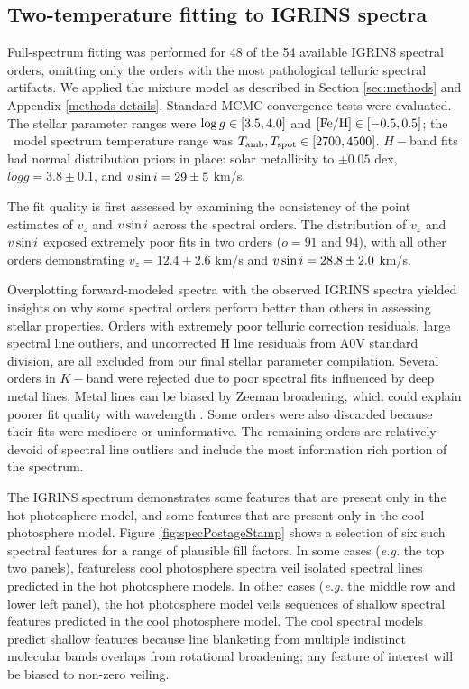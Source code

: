 \documentclass[twocolumn]{emulateapj}%
\begin{document}


\subsection{Two-temperature fitting to IGRINS spectra}\label{sec:two_tempIGRINS}


Full-spectrum fitting was performed for 48 of the 54 available IGRINS spectral orders, omitting only the orders with the most pathological telluric spectral artifacts. We applied the mixture model as described in Section \ref{sec:methods} and Appendix \ref{methods-details}.  Standard MCMC convergence tests were evaluated.  The stellar parameter ranges were $\log g \in [3.5, 4.0]$ and $[{\rm Fe}/{\rm H}] \in [-0.5, 0.5]$; the \PHOENIX\ model spectrum temperature range was $T_\textrm{amb}, T_\textrm{spot} \in [2700, 4500]$.  $H-$band fits had normal distribution priors in place: solar metallicity to $\pm0.05$ dex, $logg=3.8\pm0.1$, and $v \sin i=29\pm5$ km/s.

The fit quality is first assessed by examining the consistency of the point estimates of $v_z$ and $v \sin i$ across the spectral orders.  The distribution of $v_z$ and $v \sin i$ exposed extremely poor fits in two orders ($o=91$ and $94$), with all other orders demonstrating $v_z = 12.4 \pm 2.6$ km/s and $v \sin i = 28.8 \pm 2.0$ km/s.

Overplotting forward-modeled spectra with the observed IGRINS spectra yielded insights on why some spectral orders perform better than others in assessing stellar properties.  Orders with extremely poor telluric correction residuals, large spectral line outliers, and uncorrected H line residuals from A0V standard division, are all excluded from our final stellar parameter compilation.  Several orders in $K-$band were rejected due to poor spectral fits influenced by deep metal lines.  Metal lines can be biased by Zeeman broadening, which could explain poorer fit quality with wavelength \citep{johnskrull07,deen13}.  Some orders were also discarded because their fits were mediocre or uninformative.  The remaining orders are relatively devoid of spectral line outliers and include the most information rich portion of the spectrum.

The IGRINS spectrum demonstrates some features that are present only in the hot photosphere model, and some features that are present only in the cool photosphere model.  Figure \ref{fig:specPostageStamp} shows a selection of six such spectral features for a range of plausible fill factors.  In some cases (\emph{e.g.} the top two panels), featureless cool photosphere spectra veil isolated spectral lines predicted in the hot photosphere models.  In other cases (\emph{e.g.} the middle row and lower left panel), the hot photosphere model veils sequences of shallow spectral features predicted in the cool photosphere model.  The cool spectral models predict shallow features because line blanketing from multiple indistinct molecular bands overlaps from rotational broadening; any feature of interest will be biased to non-zero veiling.  
\end{document}
